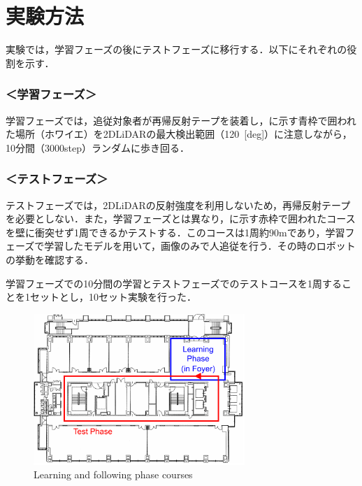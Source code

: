 \section{実験方法}

  実験では，学習フェーズの後にテストフェーズに移行する．以下にそれぞれの役割を示す．

  \subsubsection*{＜学習フェーズ＞}
  学習フェーズでは，追従対象者が再帰反射テープを装着し，に示す青枠で囲われた場所（ホワイエ）を2DLiDARの最大検出範囲（120\, [deg]）に注意しながら，10分間（3000step）ランダムに歩き回る．

  \subsubsection*{＜テストフェーズ＞}
  テストフェーズでは，2DLiDARの反射強度を利用しないため，再帰反射テープを必要としない．また，学習フェーズとは異なり，に示す赤枠で囲われたコースを壁に衝突せず1周できるかテストする．このコースは1周約90mであり，学習フェーズで学習したモデルを用いて，画像のみで人追従を行う．その時のロボットの挙動を確認する．

  \vspace{0.5cm}

  学習フェーズでの10分間の学習とテストフェーズでのテストコースを1周することを1セットとし，10セット実験を行った．

  \begin{figure}[h]
    \centering
    \includegraphics[width=8cm] {images/pdf/RobotGuidance_course}
    \captionsetup{justification=raggedright} %
    \caption{Learning and following phase courses}
    \label{Fig:RobotGuidance_course}
  \end{figure}


